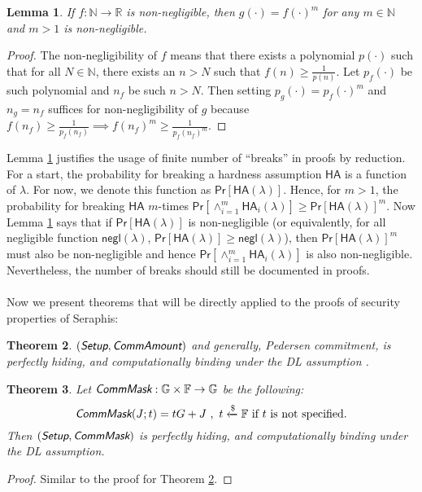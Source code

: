 \documentclass{article}
\newtheorem{theorem}{Theorem}[section]
\newtheorem{lemma}[theorem]{Lemma}
\begin{document}
\begin{lemma}\label{negl-exp}
If $f:\mathbb{N}\rightarrow\mathbb{R}$ is non-negligible, then $g(\cdot)=f(\cdot)^m$ for any $m\in\mathbb{N}$ and $m>1$ is non-negligible.
\end{lemma}
\begin{proof}
The non-negligibility of $f$ means that there exists a polynomial $p(\cdot)$ such that for all $N\in\mathbb{N}$, there exists an $n>N$ such that $f(n)\ge\frac{1}{p(n)}$. Let $p_f(\cdot)$ be such polynomial and $n_f$ be such $n>N$. Then setting $p_g(\cdot)=p_f(\cdot)^m$ and $n_g=n_f$ suffices for non-negligibility of $g$ because $f(n_f)\ge\frac{1}{p_f(n_f)}\implies f(n_f)^m\ge\frac{1}{p_f(n_f)^m}$.
\end{proof}
\noindent Lemma \ref{negl-exp} justifies the usage of finite number of ``breaks'' in proofs by reduction. For a start, the probability for breaking a hardness assumption $\textsf{HA}$ is a function of $\lambda$. For now, we denote this function as $\textsf{Pr}[\textsf{HA}(\lambda)]$. Hence, for $m>1$, the probability for breaking $\textsf{HA}$ $m$-times $\textsf{Pr}[\wedge_{i=1}^{m}{\textsf{HA}_i(\lambda)}]\ge\textsf{Pr}[\textsf{HA}(\lambda)]^m$. Now Lemma \ref{negl-exp} says that if $\textsf{Pr}[\textsf{HA}(\lambda)]$ is non-negligible (or equivalently, for all negligible function $\textsf{negl}(\lambda)$, $\textsf{Pr}[\textsf{HA}(\lambda)]\ge\textsf{negl}(\lambda)$), then $\textsf{Pr}[\textsf{HA}(\lambda)]^m$ must also be non-negligible and hence $\textsf{Pr}[\wedge_{i=1}^{m}{\textsf{HA}_i(\lambda)}]$ is also non-negligible. Nevertheless, the number of breaks should still be documented in proofs.
\\\\
Now we present theorems that will be directly applied to the proofs of security properties of Seraphis:
\begin{theorem}\label{thm-pedersen}
$(\emph{\textsf{Setup}},\emph{\textsf{CommAmount}})$ and generally, Pedersen commitment, is perfectly hiding, and computationally binding under the DL assumption \emph{\cite{pedersen}}.
\end{theorem}
\begin{theorem}
Let $\emph{\textsf{CommMask}}:\mathbb{G}\times\mathbb{F}\rightarrow\mathbb{G}$ be the following:
$$\emph{\textsf{CommMask}}(J; t) = t G + J \ , \ t\xleftarrow{\$}\mathbb{F}\ \text{if}\ t\ \text{is not specified.}$$
Then $(\emph{\textsf{Setup}},\emph{\textsf{CommMask}})$ is perfectly hiding, and computationally binding under the DL assumption.
\end{theorem}
\begin{proof}
Similar to the proof for Theorem \ref{thm-pedersen}.
\end{proof}
\end{document}
